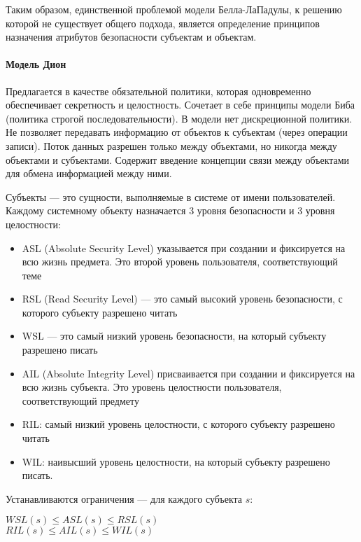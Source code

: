 Таким образом, единственной проблемой модели Белла-ЛаПадулы, к решению которой не существует общего подхода, является определение принципов назначения атрибутов безопасности субъектам и объектам.

\paragraph{Модель Дион}

Предлагается в качестве обязательной политики, которая одновременно обеспечивает секретность и целостность.
Сочетает в себе принципы модели Биба (политика строгой последовательности). В модели нет дискреционной
политики. Не позволяет передавать информацию от объектов к субъектам (через операции записи). Поток данных
разрешен только между объектами, но никогда между объектами и субъектами. Содержит введение концепции связи между
объектами для обмена информацией между ними.

Субъекты --- это сущности, выполняемые в системе от имени пользователей. Каждому системному объекту назначается
3 уровня безопасности и 3 уровня целостности:
\begin{itemize}
    \item ASL (Absolute Security Level) указывается при создании и фиксируется на всю жизнь предмета. Это второй уровень
    пользователя, соответствующий теме
    \item RSL (Read Security Level) --- это самый высокий уровень безопасности, с которого субъекту разрешено читать
    \item WSL --- это самый низкий уровень безопасности, на который субъекту разрешено писать
    \item AIL (Absolute Integrity Level) присваивается при создании и фиксируется на всю жизнь субъекта. Это уровень
    целостности пользователя, соответствующий предмету
    \item RIL: самый низкий уровень целостности, с которого субъекту разрешено читать
    \item WIL: наивысший уровень целостности, на который субъекту разрешено писать.
\end{itemize}

Устанавливаются ограничения --- для каждого субъекта $s$:

\begin{center}
$WSL(s) \leqslant ASL(s) \leq RSL(s)$ \\
$RIL(s) \leqslant AIL(s) \leq WIL(s)$
\end{center}

